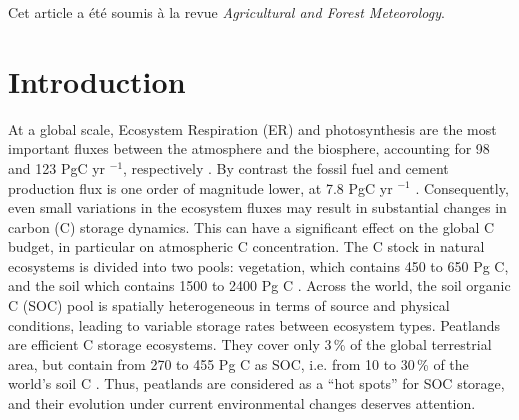 Cet article a été soumis à la revue \textit{Agricultural and Forest Meteorology}.

\section{Introduction}
At a global scale, Ecosystem Respiration (ER) and photosynthesis are the most important fluxes between the atmosphere and the biosphere, accounting for 98 and 123 PgC yr $^{-1}$, respectively \citep{Bond-Lamberty2010,Beer2010}. 
By contrast the fossil fuel and cement production flux is one order of magnitude lower, at 7.8 PgC yr $^{-1}$ \citep{Ciais2014}.
Consequently, even small variations in the ecosystem fluxes may result in substantial changes in carbon (C) storage dynamics.
This can have a significant effect on the global C budget, in particular on atmospheric C concentration.
The C stock in natural ecosystems is divided into two pools: vegetation, which contains 450 to 650 Pg C, and the soil which contains 1500 to 2400 Pg C \citep{prentice2001,Eswaran1993,batjes1996}.
Across the world, the soil organic C (SOC) pool is spatially heterogeneous in terms of source and physical conditions, leading to variable storage rates between ecosystem types.
Peatlands are efficient C storage ecosystems.
They cover only 3\,\% of the global terrestrial area, but contain from 270 to 455 Pg C as SOC, i.e. from 10 to 30\,\% of the world's soil C \citep{gorham1991, turunen2002}.
Thus, peatlands are considered as a “hot spots” for SOC storage, and their evolution under current environmental changes deserves attention.

